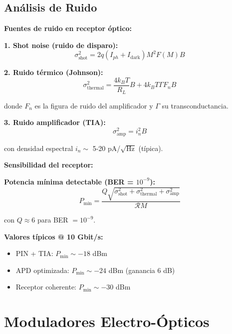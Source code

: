 \documentclass[11pt,a4paper]{article}
\begin{document}
\subsection{Análisis de Ruido}

\textbf{Fuentes de ruido en receptor óptico:}

\textbf{1. Shot noise (ruido de disparo):}
\begin{equation}
    \sigma_{\text{shot}}^2 = 2q(I_{ph} + I_{\text{dark}})M^2F(M)B
\end{equation}

\textbf{2. Ruido térmico (Johnson):}
\begin{equation}
    \sigma_{\text{thermal}}^2 = \frac{4k_BT}{R_L}B + 4k_BT\Gamma F_n B
\end{equation}

donde $F_n$ es la figura de ruido del amplificador y $\Gamma$ su transconductancia.

\textbf{3. Ruido amplificador (TIA):}
\begin{equation}
    \sigma_{\text{amp}}^2 = i_n^2 B
\end{equation}

con densidad espectral $i_n \sim$ 5-20 pA/$\sqrt{\text{Hz}}$ (típica).

\textbf{Sensibilidad del receptor:}

\textbf{Potencia mínima detectable (BER = $10^{-9}$):}
\begin{equation}
    P_{\text{min}} = \frac{Q\sqrt{\sigma_{\text{shot}}^2 + \sigma_{\text{thermal}}^2 + \sigma_{\text{amp}}^2}}{\mathcal{R}M}
\end{equation}

con $Q \approx 6$ para BER $= 10^{-9}$.

\textbf{Valores típicos @ 10 Gbit/s:}
\begin{itemize}
    \item PIN + TIA: $P_{\text{min}} \sim -18$ dBm
    \item APD optimizada: $P_{\text{min}} \sim -24$ dBm (ganancia 6 dB)
    \item Receptor coherente: $P_{\text{min}} \sim -30$ dBm
\end{itemize}

\section{Moduladores Electro-Ópticos}
\end{document}
